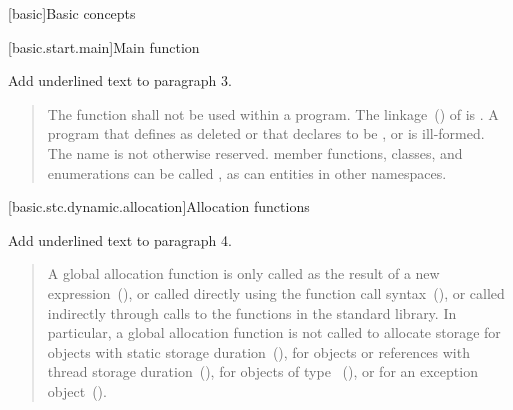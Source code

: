 
\setcounter{chapter}{2}
[basic]{Basic concepts}

\setcounter{section}{6}

[basic.start.main]{Main function}

Add underlined text to paragraph 3.

\begin{quote}
	\setcounter{Paras}{2}

\pnum
The function  shall not be used within
a program.
%
The linkage~() of  is
. A program that defines  as
deleted or that declares  to be
 , or  is ill-formed. 
The name  is
not otherwise reserved. \enterexample member functions, classes, and
enumerations can be called , as can entities in other
namespaces. \exitexample
\end{quote}

\setcounter{section}{7}
\setcounter{subsection}{4}
[basic.stc.dynamic.allocation]{Allocation functions}

Add underlined text to paragraph 4.

\begin{quote}
	\setcounter{Paras}{3}
\pnum
A global allocation function is only called as the result of a new
expression~(), or called directly using the function call
syntax~(), 
or called indirectly through calls to the
functions in the \Cpp standard library. \enternote In particular, a
global allocation function is not called to allocate storage for objects
with static storage duration~(), for objects or references
with thread storage duration~(), for objects of
type ~(), or for an
exception object~().
\exitnote
\end{quote}


